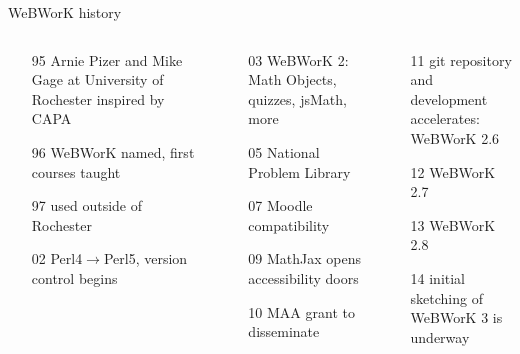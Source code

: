 \documentclass{beamer}
\begin{document}
\begin{frame}[label=wwhistory]{WeBWorK history}
\small
\begin{columns}[t]
    \begin{column}{.33\textwidth}
        \begin{itemize}
		\item[95] Arnie Pizer and Mike Gage at University of Rochester inspired by CAPA
		\item[96] WeBWorK named, first courses taught
		\item[97] used outside of Rochester %
		\item[02] Perl4$\to$Perl5, version control begins
        \end{itemize}
    \end{column}%
    \hfill\pause
    \begin{column}{.33\textwidth}
        \begin{itemize}
        		\item[03] WeBWorK 2:  Math Objects, quizzes, jsMath, more
		\item[05] National Problem Library
		\item[07] Moodle compatibility
		\item[09] MathJax opens accessibility doors
            	\item[10] MAA grant to disseminate
        \end{itemize}
    \end{column}%
    \hfill\pause
    \begin{column}{.33\textwidth}
        \begin{itemize}
        		\item[11] git repository and development accelerates:\\
		WeBWorK 2.6 %
		\item[12]  WeBWorK 2.7 %
		\item[13]  WeBWorK 2.8 %
		\item[14] initial sketching of WeBWorK 3 is underway
        \end{itemize}
    \end{column}
\end{columns}
\end{frame}
\end{document}
